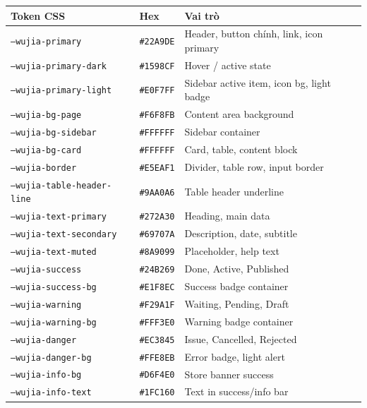 \begin{longtable}{p{4.5cm} p{2cm} p{8cm}}
\toprule
\textbf{Token CSS} & \textbf{Hex} & \textbf{Vai trò} \\
\midrule
\endhead
\texttt{--wujia-primary}        & \texttt{\#22A9DE} & Header, button chính, link, icon primary \\
\texttt{--wujia-primary-dark}   & \texttt{\#1598CF} & Hover / active state \\
\texttt{--wujia-primary-light}  & \texttt{\#E0F7FF} & Sidebar active item, icon bg, light badge \\
\texttt{--wujia-bg-page}        & \texttt{\#F6F8FB} & Content area background \\
\texttt{--wujia-bg-sidebar}     & \texttt{\#FFFFFF} & Sidebar container \\
\texttt{--wujia-bg-card}        & \texttt{\#FFFFFF} & Card, table, content block \\
\texttt{--wujia-border}         & \texttt{\#E5EAF1} & Divider, table row, input border \\
\texttt{--wujia-table-header-line} & \texttt{\#9AA0A6} & Table header underline \\
\texttt{--wujia-text-primary}   & \texttt{\#272A30} & Heading, main data \\
\texttt{--wujia-text-secondary} & \texttt{\#69707A} & Description, date, subtitle \\
\texttt{--wujia-text-muted}     & \texttt{\#8A9099} & Placeholder, help text \\
\texttt{--wujia-success}        & \texttt{\#24B269} & Done, Active, Published \\
\texttt{--wujia-success-bg}     & \texttt{\#E1F8EC} & Success badge container \\
\texttt{--wujia-warning}        & \texttt{\#F29A1F} & Waiting, Pending, Draft \\
\texttt{--wujia-warning-bg}     & \texttt{\#FFF3E0} & Warning badge container \\
\texttt{--wujia-danger}         & \texttt{\#EC3845} & Issue, Cancelled, Rejected \\
\texttt{--wujia-danger-bg}      & \texttt{\#FFE8EB} & Error badge, light alert \\
\texttt{--wujia-info-bg}        & \texttt{\#D6F4E0} & Store banner success \\
\texttt{--wujia-info-text}      & \texttt{\#1FC160} & Text in success/info bar \\
\bottomrule
\end{longtable}

